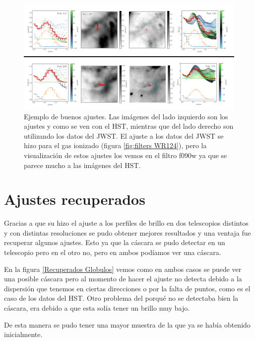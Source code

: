 \documentclass{book}
\begin{document}
\begin{figure}[htb]
    \centering
    \includegraphics[width=\textwidth]{Nuevas imagenes finales/C4_Buenos_ajustes_.pdf}
    \caption{Ejemplo de buenos ajustes. Las imágenes del lado izquierdo son los ajustes y como se ven con el HST, mientras que del lado derecho son utilizando los datos del JWST. El ajuste a los datos del JWST se hizo para el gas ionizado (figura \ref{fig:filters WR124}), pero la visualización de estos ajustes los vemos en el filtro f090w ya que se parece mucho a las imágenes del HST.}
    \label{Goog G}
\end{figure}

\section{Ajustes recuperados}

Gracias a que su hizo el ajuste a los perfiles de brillo en dos telescopios distintos y con distintas resoluciones se pudo obtener mejores resultados y una ventaja fue recuperar algunos ajustes. Esto ya que la cáscara se pudo detectar en un telescopio pero en el otro no, pero en ambos podíamos ver una cáscara. 

En la figura \ref{Recuperados Globulos} vemos como en  ambos casos se puede ver una posible cáscara pero al momento de hacer el ajuste no detecta debido a la dispersión que tenemos en ciertas direcciones o por la falta de puntos, como es el caso de los datos del HST. Otro problema del porqué no se detectaba bien la cáscara, era debido a que esta solía tener un brillo muy bajo.

De esta manera se pudo tener una mayor muestra de la que ya se había obtenido inicialmente.
\end{document}
